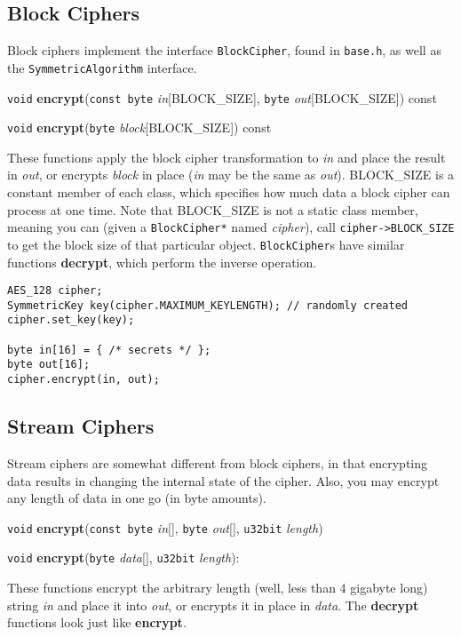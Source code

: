 \documentclass{article}
\newcommand{\filename}[1]{\texttt{#1}}
\newcommand{\function}[1]{\textbf{#1}}
\newcommand{\type}[1]{\texttt{#1}}
\renewcommand{\arg}[1]{\textsl{#1}}
\begin{document}
\subsection{Block Ciphers}

Block ciphers implement the interface \type{BlockCipher}, found in
\filename{base.h}, as well as the \type{SymmetricAlgorithm} interface.

\noindent
\type{void} \function{encrypt}(\type{const byte} \arg{in}[BLOCK\_SIZE],
                               \type{byte} \arg{out}[BLOCK\_SIZE]) const

\noindent
\type{void} \function{encrypt}(\type{byte} \arg{block}[BLOCK\_SIZE]) const

These functions apply the block cipher transformation to \arg{in} and
place the result in \arg{out}, or encrypts \arg{block} in place
(\arg{in} may be the same as \arg{out}). BLOCK\_SIZE is a constant
member of each class, which specifies how much data a block cipher can
process at one time. Note that BLOCK\_SIZE is not a static class
member, meaning you can (given a \type{BlockCipher*} named
\arg{cipher}), call \verb|cipher->BLOCK_SIZE| to get the block size of
that particular object. \type{BlockCipher}s have similar functions
\function{decrypt}, which perform the inverse operation.

\begin{verbatim}
AES_128 cipher;
SymmetricKey key(cipher.MAXIMUM_KEYLENGTH); // randomly created
cipher.set_key(key);

byte in[16] = { /* secrets */ };
byte out[16];
cipher.encrypt(in, out);
\end{verbatim}

\subsection{Stream Ciphers}

Stream ciphers are somewhat different from block ciphers, in that encrypting
data results in changing the internal state of the cipher. Also, you may
encrypt any length of data in one go (in byte amounts).

\noindent
\type{void} \function{encrypt}(\type{const byte} \arg{in}[], \type{byte}
\arg{out}[], \type{u32bit} \arg{length})

\noindent
\type{void} \function{encrypt}(\type{byte} \arg{data}[], \type{u32bit}
\arg{length}):

These functions encrypt the arbitrary length (well, less than 4 gigabyte long)
string \arg{in} and place it into \arg{out}, or encrypts it in place in
\arg{data}. The \function{decrypt} functions look just like
\function{encrypt}.
\end{document}

